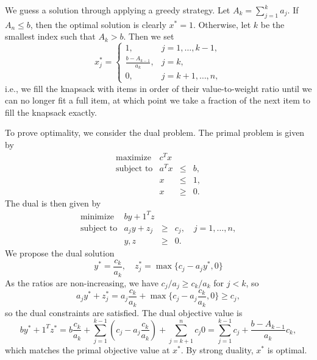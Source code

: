 \begin{solution}
  We guess a solution through applying a greedy strategy.
  Let $A_k = \sum_{j=1}^{k} a_j$.
  If $A_n \leq b$, then the optimal solution is clearly $x^* = 1$.
  Otherwise, let $k$ be the smallest index such that $A_k > b$.
  Then we set
  \begin{equation}
    x_j^* =
    \begin{cases}
      1, & j = 1, \ldots, k - 1, \\
      \frac{b - A_{k - 1}}{a_{k}}, & j = k, \\
      0, & j = k + 1, \ldots, n,
    \end{cases}
  \end{equation}
  i.e., we fill the knapsack with items in order of their value-to-weight ratio until we can no longer fit a full item, at which point we take a fraction of the next item to fill the knapsack exactly.

  To prove optimality, we consider the dual problem.
  The primal problem is given by
  \begin{equation}
    \begin{array}{rrcl}
      \text{maximize} & c^T x \\
      \text{subject to} & a^T x & \leq & b, \\
      & x & \leq & 1, \\
      & x & \geq & 0.
    \end{array}
  \end{equation}
  The dual is then given by
  \begin{equation}
    \begin{array}{rrcl}
      \text{minimize} & b y + 1^T z \\
      \text{subject to} & a_j y + z_j & \geq & c_j, \quad j = 1, \ldots, n, \\
      & y, z & \geq & 0.
    \end{array}
  \end{equation}
  We propose the dual solution
  \begin{equation}
    y^* = \frac{c_{k}}{a_{k}}, \quad
    z_j^* = \max\{ c_j - a_j y^*, 0 \}
  \end{equation}
  As the ratios are non-increasing, we have $c_j/a_j \geq c_k/a_k$ for $j < k$, so
  \begin{equation}
    a_j y^* + z_j^*
    = a_j \frac{c_k}{a_k} + \max\{ c_j - a_j \frac{c_k}{a_k}, 0 \}
    \geq c_j,
  \end{equation}
  so the dual constraints are satisfied.
  The dual objective value is
  \begin{equation}
    b y^* + 1^T z^*
    = b \frac{c_k}{a_k} + \sum_{j=1}^{k-1} (c_j - a_j \frac{c_k}{a_k}) + \sum_{j=k+1}^{n} c_j 0
    = \sum_{j=1}^{k-1} c_j + \frac{b - A_{k-1}}{a_k} c_k,
  \end{equation}
  which matches the primal objective value at $x^*$.
  By strong duality, $x^*$ is optimal.


\end{solution}
